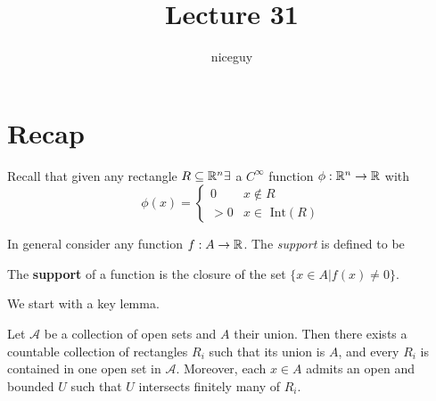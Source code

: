 \documentclass[12pt]{article}
\title{Lecture 31}
\author{niceguy}
\begin{document}
\maketitle

\section{Recap}

Recall that given any rectangle $R \subseteq \mathbb{R}^n \exists$ a $C^\infty$ function $\phi: \mathbb{R}^n \rightarrow \mathbb{R}$ with
$$\phi(x) = \begin{cases} 0 & x \notin R \\ > 0 & x \in \text{ Int}(R) \end{cases}$$

In general consider any function $f:A \rightarrow \mathbb{R}$. The \textit{support} is defined to be

\begin{defn}[Support]
    The \textbf{support} of a function is the closure of the set $\{x \in A | f(x) \neq 0\}$.
\end{defn}

We start with a key lemma.

\begin{lem}
    Let $\mathcal A$ be a collection of open sets and $A$ their union. Then there exists a countable collection of rectangles $R_i$ such that its union is $A$, and every $R_i$ is contained in one open set in $\mathcal A$. Moreover, each $x \in A$ admits an open and bounded $U$ such that $U$ intersects finitely many of $R_i$.
\end{lem}
\end{document}
